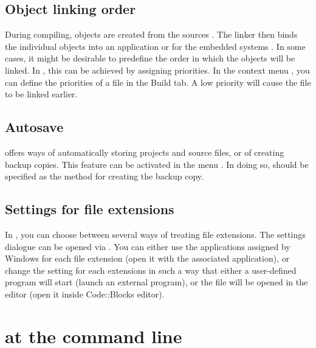\subsection{Object linking order}

During compiling, objects  are created from the sources . The linker then binds the individual objects into an application  or for the embedded systems . In some cases, it might be desirable to predefine the order in which the objects will be linked. In \codeblocks, this can be achieved by assigning priorities. In the context menu , you can define the priorities of a file in the Build tab. A low priority will cause the file to be linked earlier.

\subsection{Autosave}

\codeblocks offers ways of automatically storing projects and source files, or of creating backup copies. This feature can be activated in the menu . In doing so,  should be specified as the method for creating the backup copy.

\subsection{Settings for file extensions}\label{sec:file_extension}

In \codeblocks, you can choose between several ways of treating file extensions. The settings dialogue can be opened via .
You can either use the applications assigned by Windows for each file extension (open it with the associated application), or change the setting for each extensions in such a way that either a user-defined program will start (launch an external program), or the file will be opened in the \codeblocks editor (open it inside Code::Blocks editor).


\section{\codeblocks at the command line}


